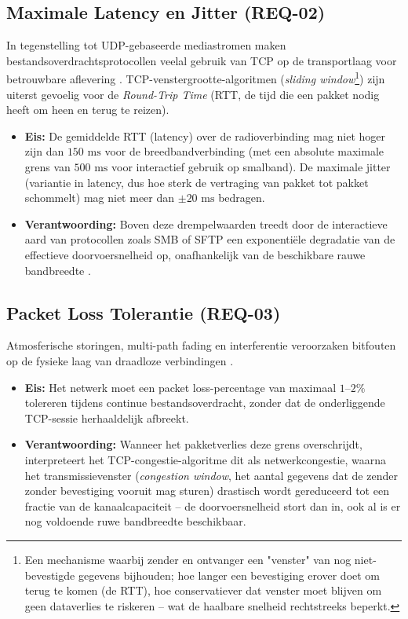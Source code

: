 \subsection{Maximale Latency en Jitter (REQ-02)}
In tegenstelling tot UDP-gebaseerde mediastromen maken bestandsoverdrachtsprotocollen veelal gebruik van TCP op de transportlaag voor betrouwbare aflevering \autocite{Tanenbaum2021}. TCP-venstergrootte-algoritmen (\textit{sliding window}\footnote{Een mechanisme waarbij zender en ontvanger een "venster" van nog niet-bevestigde gegevens bijhouden; hoe langer een bevestiging erover doet om terug te komen (de RTT), hoe conservatiever dat venster moet blijven om geen dataverlies te riskeren -- wat de haalbare snelheid rechtstreeks beperkt.}) zijn uiterst gevoelig voor de \textit{Round-Trip Time} (RTT, de tijd die een pakket nodig heeft om heen en terug te reizen).
\begin{itemize}
    \item \textbf{Eis:} De gemiddelde RTT (latency) over de radioverbinding mag niet hoger zijn dan $150\text{ ms}$ voor de breedbandverbinding (met een absolute maximale grens van $500\text{ ms}$ voor interactief gebruik op smalband). De maximale jitter (variantie in latency, dus hoe sterk de vertraging van pakket tot pakket schommelt) mag niet meer dan $\pm 20\text{ ms}$ bedragen.
    \item \textbf{Verantwoording:} Boven deze drempelwaarden treedt door de interactieve aard van protocollen zoals SMB of SFTP een exponentiële degradatie van de effectieve doorvoersnelheid op, onafhankelijk van de beschikbare rauwe bandbreedte \autocite{Pollefliet2011}.
\end{itemize}

\subsection{Packet Loss Tolerantie (REQ-03)}
Atmosferische storingen, multi-path fading en interferentie veroorzaken bitfouten op de fysieke laag van draadloze verbindingen \autocite{Tanenbaum2021}.
\begin{itemize}
    \item \textbf{Eis:} Het netwerk moet een packet loss-percentage van maximaal $1\text{--}2\%$ tolereren tijdens continue bestandsoverdracht, zonder dat de onderliggende TCP-sessie herhaaldelijk afbreekt.
    \item \textbf{Verantwoording:} Wanneer het pakketverlies deze grens overschrijdt, interpreteert het TCP-congestie-algoritme dit als netwerkcongestie, waarna het transmissievenster (\textit{congestion window}, het aantal gegevens dat de zender zonder bevestiging vooruit mag sturen) drastisch wordt gereduceerd tot een fractie van de kanaalcapaciteit -- de doorvoersnelheid stort dan in, ook al is er nog voldoende ruwe bandbreedte beschikbaar.
\end{itemize}

